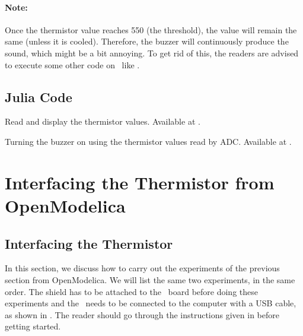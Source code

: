 \begin{enumerate}
        \paragraph{Note:} Once the thermistor value reaches 550 (the threshold), the value will remain the same
        (unless it is cooled). Therefore, the buzzer will continuously produce the sound, which might be
        a bit annoying. To get rid of this, the readers are advised to
        execute some other code on \arduino\ like .

\end{enumerate}

\subsection{Julia Code}
\label{sec:therm-julia-code}

\begin{juliacode}
   {Read and display
    the thermistor values. Available at
    .}
  \label{julia:therm-read}
  
\end{juliacode}

\begin{juliacode}
  {Turning the buzzer on using the thermistor values read by
    ADC.  Available at .}
  \label{julia:therm-buzzer}
  
\end{juliacode}

\section{Interfacing the Thermistor from OpenModelica}
\subsection{Interfacing the Thermistor}
In this section, we discuss how to carry out the experiments of the
previous section from OpenModelica.  We will list the same two experiments,
in the same order.  The shield has to be attached to the \arduino\ board
before doing these experiments and the \arduino\ needs to be connected to the computer
with a USB cable, as shown in .
The reader should go through the instructions given in
 before getting started.

